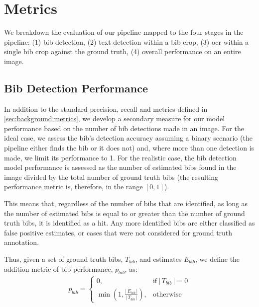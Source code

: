 \section{Metrics}
\label{sec:evaluation:metrics}

We breakdown the evaluation of our pipeline mapped to the four stages in the pipeline: (1) bib detection, (2) text detection within a bib crop, (3) \gls{ocr} within a single bib crop against the ground truth, (4) overall performance on an entire image.

\subsection{Bib Detection Performance}
\label{sec:evaluation:metrics:bib}


In addition to the standard precision, recall and \fscore{} metrics defined in \cref{sec:background:metrics}, we develop a secondary measure for our model performance based on the number of bib detections made in an image. For the ideal case, we assess the bib's detection accuracy assuming a binary scenario (the pipeline either finds the bib or it does not) and, where more than one detection is made, we limit its performance to 1. For the realistic case, the bib detection model performance is assessed as the number of estimated bibs found in the image divided by the total number of ground truth bibs (the resulting performance metric is, therefore, in the range $[0, 1]$).

This means that, regardless of the number of bibs that are identified, as long as the number of estimated bibs is equal to or greater than the number of ground truth bibs, it is identified as a hit. Any more identified bibs are either classified as false positive estimates, or cases that were not considered for ground truth annotation.

Thus, given a set of ground truth bibs, $T_{bib}$, and estimates $E_{bib}$, we define the addition metric of bib performance, $p_{bib}$, as:
\begin{align*}
  p_{bib} =
  \begin{cases}
    0,                                          & \textrm{if}\ \lvert\,T_{bib}\,\rvert = 0\\
    \min\left(1, \frac{\lvert\,E_{bib}\,\rvert}{\lvert\,T_{bib}\,\rvert}\right), & \textrm{otherwise}
  \end{cases}
\end{align*}

